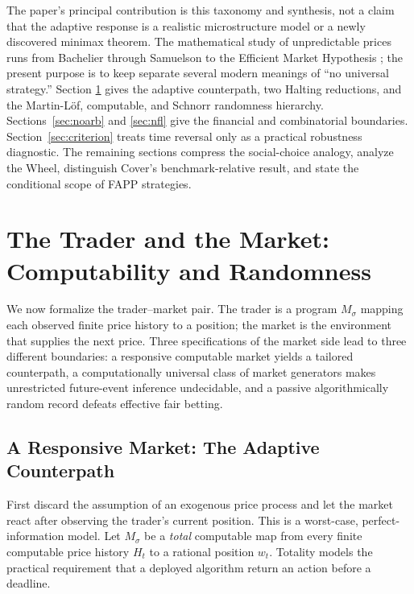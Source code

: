 \documentclass[aps,pra,reprint,superscriptaddress,amsmath,amssymb,floatfix]{revtex4-2}
\theoremstyle{plain}
\theoremstyle{definition}
\theoremstyle{remark}
\begin{document}
The paper's principal contribution is this taxonomy and synthesis, not a claim
that the adaptive response is a realistic microstructure model or a newly
discovered minimax theorem. The mathematical study of unpredictable prices
runs from Bachelier through Samuelson to the Efficient Market Hypothesis
\cite{Bachelier1900,Samuelson1965,Fama1970}; the present purpose is to keep
separate several modern meanings of ``no universal strategy.'' Section
\ref{sec:computability} gives the adaptive counterpath, two Halting reductions,
and the Martin-L\"of, computable, and Schnorr randomness hierarchy.
Sections~\ref{sec:noarb} and \ref{sec:nfl} give the financial and combinatorial
boundaries. Section~\ref{sec:criterion} treats time reversal only as a practical
robustness diagnostic. The remaining sections compress the social-choice
analogy, analyze the Wheel, distinguish Cover's benchmark-relative result, and
state the conditional scope of FAPP strategies.

\section{The Trader and the Market: Computability and Randomness}
\label{sec:computability}

We now formalize the trader--market pair. The trader is a program
\(M_\sigma\) mapping each observed finite price history to a position; the
market is the environment that supplies the next price. Three specifications
of the market side lead to three different boundaries: a responsive computable
market yields a tailored counterpath, a computationally universal class of
market generators makes unrestricted future-event inference undecidable, and
a passive algorithmically random record defeats effective fair betting.

\subsection{A Responsive Market: The Adaptive Counterpath}

First discard the assumption of an exogenous price process and let the market
react after observing the trader's current position. This is a worst-case,
perfect-information model. Let \(M_\sigma\) be a \emph{total} computable map
from every finite computable price history \(H_t\) to a rational position
\(w_t\). Totality models the practical requirement that a deployed algorithm
return an action before a deadline.
\end{document}
